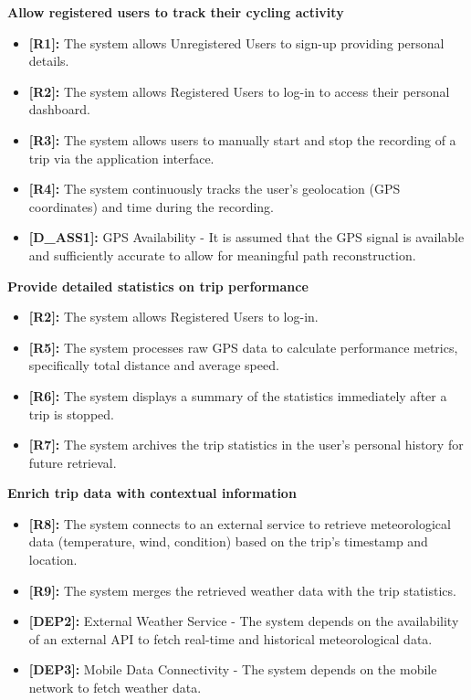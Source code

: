 \begin{enumerate}[label=\textbf{-[G\arabic*]}:]
    
    \item \textbf{Allow registered users to track their cycling activity}
    \begin{itemize}
        \item \textbf{[R1]:} The system allows Unregistered Users to sign-up providing personal details.
        \item \textbf{[R2]:} The system allows Registered Users to log-in to access their personal dashboard.
        \item \textbf{[R3]:} The system allows users to manually start and stop the recording of a trip via the application interface.
        \item \textbf{[R4]:} The system continuously tracks the user's geolocation (GPS coordinates) and time during the recording.
        \item \textbf{[D\_ASS1]:} GPS Availability - It is assumed that the GPS signal is available and sufficiently accurate to allow for meaningful path reconstruction.
    \end{itemize}

    \item \textbf{Provide detailed statistics on trip performance}
    \begin{itemize}
        \item \textbf{[R2]:} The system allows Registered Users to log-in.
        \item \textbf{[R5]:} The system processes raw GPS data to calculate performance metrics, specifically total distance and average speed.
        \item \textbf{[R6]:} The system displays a summary of the statistics immediately after a trip is stopped.
        \item \textbf{[R7]:} The system archives the trip statistics in the user's personal history for future retrieval.
    \end{itemize}

    \item \textbf{Enrich trip data with contextual information}
    \begin{itemize}
        \item \textbf{[R8]:} The system connects to an external service to retrieve meteorological data (temperature, wind, condition) based on the trip's timestamp and location.
        \item \textbf{[R9]:} The system merges the retrieved weather data with the trip statistics.
        \item \textbf{[DEP2]:} External Weather Service - The system depends on the availability of an external API to fetch real-time and historical meteorological data.
        \item \textbf{[DEP3]:} Mobile Data Connectivity - The system depends on the mobile network to fetch weather data.
    \end{itemize}


\end{enumerate}
